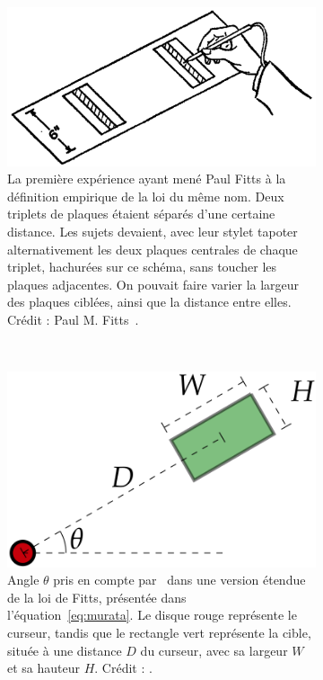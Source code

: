 	\begin{figure}[!htb]
		\begin{subfigure}[t]{0.58\textwidth}
			\centering
			\includegraphics[width=\textwidth]{figures/ch2/fitts}
			\caption{La première expérience ayant mené Paul Fitts à la  définition empirique de la loi du même nom. Deux triplets de plaques étaient séparés d'une certaine distance. Les sujets devaient, avec leur stylet \og tapoter \fg{} alternativement les deux plaques centrales de chaque triplet, hachurées sur ce schéma, sans toucher les plaques adjacentes. On pouvait faire varier la largeur des plaques ciblées, ainsi que la distance entre elles. Crédit : Paul M. Fitts~\cite{fitts1954information}.}
			\label{fig:fitts}
		\end{subfigure}
		~
		\begin{subfigure}[t]{0.40\textwidth}
			\centering
			\includegraphics[width=\textwidth]{figures/ch2/theta}
			\caption{Angle $\theta$ pris en compte par~\cite{murata2001extending} dans une version étendue de la loi de Fitts, présentée dans l'équation~\ref{eq:murata}. Le disque rouge représente le curseur, tandis que le rectangle vert représente la cible, située à une distance $D$ du curseur, avec sa largeur $W$ et sa hauteur $H$. Crédit : \cite{casallas2015prediction}.}
			\label{fig:theta}
		\end{subfigure}
		\caption{}
		\label{fig:fittstheta}
	\end{figure}
	
